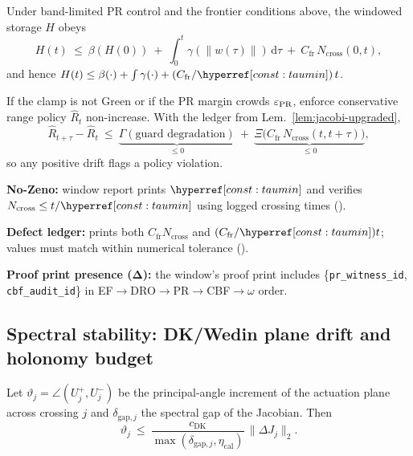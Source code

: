\begin{proposition}\label{prop:iss-spend}
Under band-limited PR control and the frontier conditions above, the windowed storage $H$ obeys
\[
H(t)\ \le\ \beta(H(0))\ +\ \int_0^t \gamma(\|w(\tau)\|)\,\mathrm d\tau\ +\ C_{\mathrm{fr}}\,N_{\mathrm{cross}}(0,t),
\]
and hence $H(t)\le \beta(\cdot)+\int\gamma(\cdot)+ (C_{\mathrm{fr}}/\constref{taumin})\,t$.
\end{proposition}

\begin{proposition}\label{prop:cons-link}
If the clamp is not Green or if the PR margin crowds $\varepsilon_{\mathrm{PR}}$, enforce conservative range policy $\hat R_t$ non-increase. With the ledger from Lem.~\ref{lem:jacobi-upgraded},
\[
\hat R_{t+\tau}-\hat R_t\ \le\ \underbrace{\Gamma(\text{guard degradation})}_{\le 0}\ +\ \underbrace{\Xi\big(C_{\mathrm{fr}}\,N_{\mathrm{cross}}(t,t+\tau)\big)}_{\le 0},
\]
so any positive drift flags a policy violation.
\end{proposition}

\begin{acceptchecks}
\item \textbf{No-Zeno:} window report prints $\constref{taumin}$ and verifies $N_{\mathrm{cross}}\le t/\constref{taumin}$ using logged crossing times (\jsgiLem{\lblNoZeno}).
\item \textbf{Defect ledger:} prints both $C_{\mathrm{fr}} N_{\mathrm{cross}}$ and $(C_{\mathrm{fr}}/\constref{taumin})t$; values must match within numerical tolerance (\jsgiLem{\lblJacobiDefect}).
\item \textbf{Proof print presence (Δ):} the window’s proof print includes \{\texttt{pr\_witness\_id}, \texttt{cbf\_audit\_id}\} in EF$\rightarrow$DRO$\rightarrow$PR$\rightarrow$CBF$\rightarrow\omega$ order.
\end{acceptchecks}

\subsection{Spectral stability: DK/Wedin plane drift and holonomy budget}\label{subsec:dk-wedin}
\emph{}

\begin{lemma}\label{lem:usc-planes}
Let $\vartheta_j=\angle(U_j^+,U_j^-)$ be the principal-angle increment of the actuation plane across crossing $j$ and $\delta_{\mathrm{gap},j}$ the spectral gap of the Jacobian. Then
\[
\vartheta_j\ \le\ \frac{c_{\mathrm{DK}}}{\max(\delta_{\mathrm{gap},j},\eta_{\mathrm{cal}})}\,\|\Delta J_j\|_2.
\]
\end{lemma}

